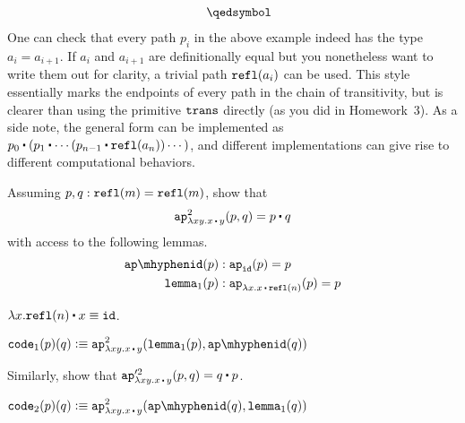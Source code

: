 \documentclass[12pt]{article}
\newcommand{\cut}[1]{}
\newcommand{\marksolution}[1]{\color{FireBrick}#1\normalcolor}%
\newcommand{\marksolution}[1]{\cut{#1}}%
\newenvironment{solution}{\trivlist \item[\hskip \labelsep{\bf
Solution:}]}{\endtrivlist}
\begin{document}
\begin{mdframed}
\[\begin{array}{l}
    \quad\qedsymbol
  \end{array}
\]
One can check that every path $p_i$ in the above example indeed has the type $a_i = a_{i+1}$.
If $a_i$ and $a_{i+1}$ are definitionally equal
but you nonetheless want to write them out for clarity,
a trivial path $\mathtt{refl}(a_i)$ can be used.
This style essentially marks the endpoints of every path
in the chain of transitivity,
but is clearer than using the primitive $\mathtt{trans}$ directly
(as you did in Homework~3).
As a side note,
the general form can be implemented as $p_0 \concat ( p_1 \concat \cdots (p_{n-1} \concat \refl(a_n)) \cdots)$,
and different implementations can give rise to different computational behaviors.
\end{mdframed}

\begin{task}
  Assuming $p, q : \mathtt{refl}(m) = \mathtt{refl}(m)$, show that
  \[
    \ap^2_{\lambda xy.x\concat y}(p,q) = p \concat q
  \]
  with access to the following lemmas.
  \begin{align*}
    \apid(p) &: \ap_{\id}(p) = p\\
    \lemmaone(p) &: \ap_{\lambda x.x\concat\refl(n)}(p) = p
  \end{align*}
  \begin{hint}
    $\lambda x.\refl(n)\concat x \jdeq \id$.
  \end{hint}
\end{task}
\marksolution{
  \begin{solution}
    $\displaystyle
      \mathtt{code}_1(p)(q) \defeq \ap^2_{\lambda xy.x\concat y}(\lemmaone(p),\apid(q))
    $
  \end{solution}
}

\begin{bonus}
  Similarly, show that $\ap'^2_{\lambda xy.x\concat y}(p,q) = q \concat p$.
\end{bonus}
\marksolution{
  \begin{solution}
    $\displaystyle
      \mathtt{code}_2(p)(q) \defeq \ap^2_{\lambda xy.x\concat y}(\apid(q),\lemmaone(q))
    $
  \end{solution}
}
\end{document}
